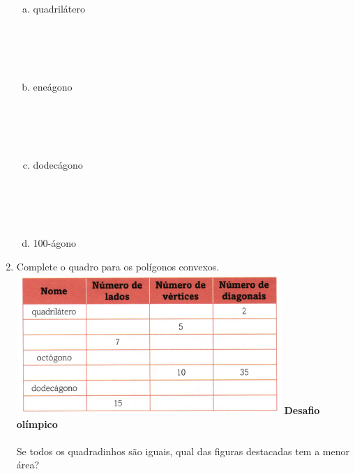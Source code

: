 \documentclass[a4paper,14pt]{article}
\begin{document}
\begin{multicols}{2}
\begin{enumerate}
\begin{enumerate}[a)]
				\item quadrilátero \\\\\\\\\\
				\item eneágono \\\\\\\\\\
				\item dodecágono \\\\\\\\\\
				\item 100-ágono \newpage
			\end{enumerate}	
			\item Complete o quadro para os polígonos convexos. \\
			\includegraphics[width=1.1\linewidth]{6FMA90_imagens/imagem1}
			\textbf{Desafio olímpico} \\\\
			Se todos os quadradinhos são iguais, qual das figuras destacadas tem a menor área?

\end{enumerate}
\end{multicols}
\end{document}
